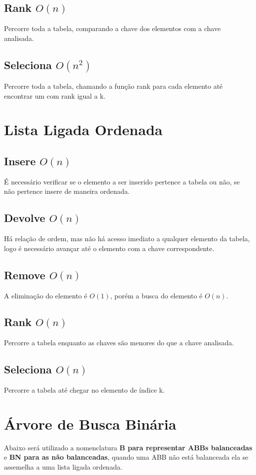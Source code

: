 \documentclass[14pt]{article}
\begin{document}
{\subsection{Rank $O(n)$}
Percorre toda a tabela, comparando a chave dos elementos com a chave analisada.
\subsection{Seleciona $O(n^2)$}
Percorre toda a tabela, chamando a função rank para cada elemento até encontrar um com rank igual a k.
\\

\section{Lista Ligada Ordenada}

\subsection{Insere $O(n)$} 
É necessário verificar se o elemento a ser inserido pertence a tabela ou não, se não pertence insere de maneira
ordenada.
\subsection{Devolve $O(n)$}
Há relação de ordem, mas não há acesso imediato a qualquer elemento da tabela, logo é necessário avançar até
o elemento com a chave correspondente.
\subsection{Remove $O(n)$}
A eliminação do elemento é $O(1)$, porém a busca do elemento é $O(n)$.
\subsection{Rank $O(n)$}
Percorre a tabela enquanto as chaves são menores do que a chave analisada.
\subsection{Seleciona $O(n)$}
Percorre a tabela até chegar no elemento de índice k.
\\

\section{Árvore de Busca Binária}
Abaixo será utilizado a nomenclatura \textbf{B para representar ABBs balanceadas} e \textbf{BN para as não balanceadas}, 
quando uma ABB não está balanceada ela se assemelha a uma lista ligada ordenada.

}
\end{document}
